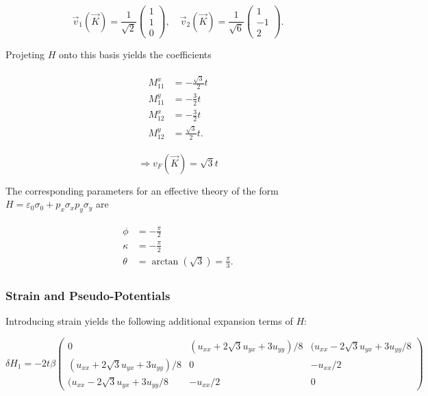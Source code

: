 \documentclass[../../../main.tex]{subfiles}
\begin{document}
\begin{equation}
	\vec{v}_1(\vec{K}) = \frac{1}{\sqrt{2}}
	\begin{pmatrix}
		1 \\
		1 \\ 
		0
	\end{pmatrix}, \quad
	\vec{v}_2(\vec{K}) = \frac{1}{\sqrt{6}}
	\begin{pmatrix}
		1 \\
		-1 \\
		2
	\end{pmatrix}.
\end{equation}

Projeting $H$ onto this basis yields the coefficients


\begin{align}
	\begin{split}
		M_{11}^x & = - \frac{\sqrt{3}}{2}t \\
		M_{11}^y &= - \frac{3}{2}t \\
		M_{12}^x &= - \frac32 t \\
		M_{12}^y &= \frac{\sqrt{3}}{2} t.
	\end{split}
\end{align}

\begin{equation}
	\Rightarrow v_F(\vec{K}) = \sqrt{3}t
\end{equation}

The corresponding parameters for an effective theory of the form $H = \varepsilon_0\sigma_0 +p_x \sigma_x p_y \sigma_y$ are 

\begin{align}
	\begin{split}
		\phi &= -\frac{\pi}{2} \\
		\kappa &= -\frac{\pi}{2} \\
		\theta &= \arctan(\sqrt{3}) = \frac{\pi}{3}.
	\end{split}
\end{align}

\subsubsection{Strain and Pseudo-Potentials}

Introducing strain yields the following additional expansion terms of $H$:

\begin{equation}
	\delta H_1 = -2t\beta
	\begin{pmatrix}
		0 & (u_{xx} + 2\sqrt{3}u_{yx}+3u_{yy})/8 & (u_{xx} - 2\sqrt{3}u_{yx}+3u_{yy}/8 \\
		(u_{xx} + 2\sqrt{3}u_{yx}+3u_{yy})/8 & 0 & -u_{xx}/2 \\
		(u_{xx} - 2\sqrt{3}u_{yx}+3u_{yy}/8 & - u_{xx}/2 & 0
	\end{pmatrix}
\end{equation}
\end{document}
